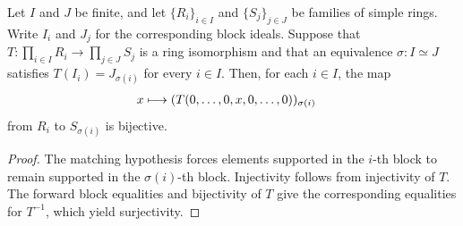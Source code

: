 \begin{theorem}
    \label{thm:component_map_bijective}
    \leanok
    Let $I$ and $J$ be finite, and let $\{R_i\}_{i\in I}$ and
    $\{S_j\}_{j\in J}$ be families of simple rings. Write $I_i$ and $J_j$ for
    the corresponding block ideals. Suppose that
    $T : \prod_{i\in I}R_i \to \prod_{j\in J}S_j$ is a ring isomorphism and
    that an equivalence $\sigma:I\simeq J$ satisfies
    $T(I_i)=J_{\sigma(i)}$ for every $i\in I$. Then, for each $i\in I$, the map
    \begin{align}
        x
        &\longmapsto
        (T(0,\ldots,0,x,0,\ldots,0))_{\sigma(i)}
        \notag
    \end{align}
    from $R_i$ to $S_{\sigma(i)}$ is bijective.
\end{theorem}

\begin{proof}\leanok
    The matching hypothesis forces elements supported in the $i$-th block to
    remain supported in the $\sigma(i)$-th block. Injectivity follows from
    injectivity of $T$. The forward block equalities and bijectivity of $T$
    give the corresponding equalities for $T^{-1}$, which yield surjectivity.
\end{proof}

